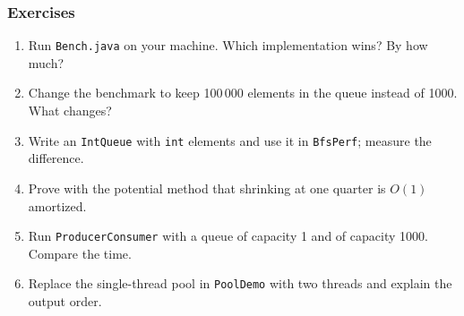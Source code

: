 \documentclass[aspectratio=169,10pt,compress]{beamer}
\begin{document}
\begin{frame}[t,fragile] \frametitle{Exercises}
  \begin{enumerate}\small
    \item Run \texttt{Bench.java} on your machine. Which implementation wins? By how much?
    \item Change the benchmark to keep 100\,000 elements in the queue instead of 1000. What changes?
    \item Write an \texttt{IntQueue} with \texttt{int} elements and use it in \texttt{BfsPerf}; measure the difference.
    \item Prove with the potential method that shrinking at one quarter is $O(1)$ amortized.
    \item Run \texttt{ProducerConsumer} with a queue of capacity 1 and of capacity 1000. Compare the time.
    \item Replace the single-thread pool in \texttt{PoolDemo} with two threads and explain the output order.
  \end{enumerate}
\end{frame}




\begin{frame}[t,fragile]
	\begin{center}
		\vspace{4cm}
	\end{center}
\end{frame}
\end{document}

